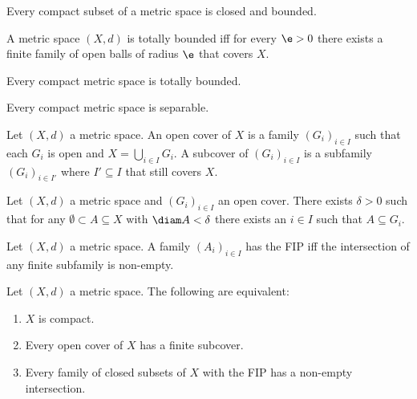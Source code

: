 \documentclass{article}
\begin{document}
\begin{proposition}[9.7, 9.8]
	Every compact subset of a metric space is closed and bounded.
\end{proposition}

\begin{definition}
	A metric space $(X,d)$ is totally bounded iff for every $\e>0$ there exists a
	finite family of open balls of radius $\e$ that covers $X$.
\end{definition}

\begin{proposition}[9.13]
	Every compact metric space is totally bounded.
\end{proposition}

\begin{proposition}[9.14]
	Every compact metric space is separable.
\end{proposition}

\begin{definition}
	Let $(X,d)$ a metric space. An open cover of $X$ is a family $(G_i)_{i\in I}$ such
	that each $G_i$ is open and $X=\bigcup_{i\in I}G_i$. A subcover of $(G_i)_{i\in I}$
	is a subfamily $(G_i)_{i\in I'}$ where $I'\subseteq I$ that still covers $X$.
\end{definition}

\begin{proposition}
	Let $(X,d)$ a metric space and $(G_i)_{i\in I}$ an open cover. There exists
	$\delta>0$ such that for any $\emptyset\subset A\subseteq X$ with $\diam A < \delta$
	there exists an $i\in I$ such that $A\subseteq G_i$.
\end{proposition}

\begin{definition}
	Let $(X,d)$ a metric space. A family $(A_i)_{i\in I}$ has the FIP iff
	the intersection of any finite subfamily is non-empty.
\end{definition}

\begin{theorem}[9.20]
	Let $(X,d)$ a metric space. The following are equivalent:
	\begin{enumerate}
		\item $X$ is compact.
		\item Every open cover of $X$ has a finite subcover.
		\item Every family of closed subsets of $X$ with the FIP has a non-empty intersection.
	\end{enumerate}
\end{theorem}
\end{document}
